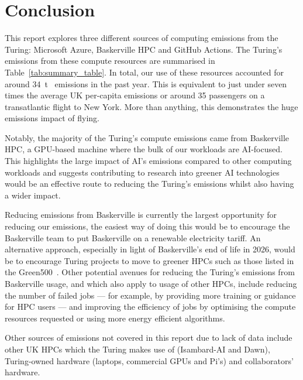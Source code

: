 \documentclass[12pt]{article}
\newcommand{\cooe}{\ensuremath{\mathrm{CO}_2\mathrm{e}}}
\newcommand{\tcooe}[1]{\qty[qualifier-mode=combine]{#1}{\tonne\of{\cooe}}}
\begin{document}
\section{Conclusion}
\label{sec:conclusion}

This report explores three different sources of computing emissions from the Turing: Microsoft Azure, Baskerville HPC and GitHub Actions. The Turing's emissions from these compute resources are summarised in Table~\ref{tab:summary_table}. In total, our use of these resources accounted for around \tcooe{34} emissions in the past year. This is equivalent to just under seven times the average UK per-capita emissions or around 35 passengers on a transatlantic flight to New York. More than anything, this demonstrates the huge emissions impact of flying.

Notably, the majority of the Turing's compute emissions came from Baskerville HPC, a GPU-based machine where the bulk of our workloads are AI-focused. This highlights the large impact of AI's emissions compared to other computing workloads and suggests contributing to research into greener AI technologies would be an effective route to reducing the Turing's emissions whilst also having a wider impact.

Reducing emissions from Baskerville is currently the largest opportunity for reducing our emissions, the easiest way of doing this would be to encourage the Baskerville team to put Baskerville on a renewable electricity tariff. 
An alternative approach, especially in light of Baskerville's end of life in 2026, would be to encourage Turing projects to move to greener HPCs such as those listed in the Green500~\cite{green500}. Other potential avenues for reducing the Turing's emissions from Baskerville usage, and which also apply to usage of other HPCs, include reducing the number of failed jobs --- for example, by providing more training or guidance for HPC users --- and improving the efficiency of jobs by optimising the compute resources requested or using more energy efficient algorithms.

Other sources of emissions not covered in this report due to lack of data include other UK HPCs which the Turing makes use of (Isambard-AI and Dawn), Turing-owned hardware (laptops, commercial GPUs and Pi's) and collaborators' hardware.

% 
\printbibliography
\end{document}
